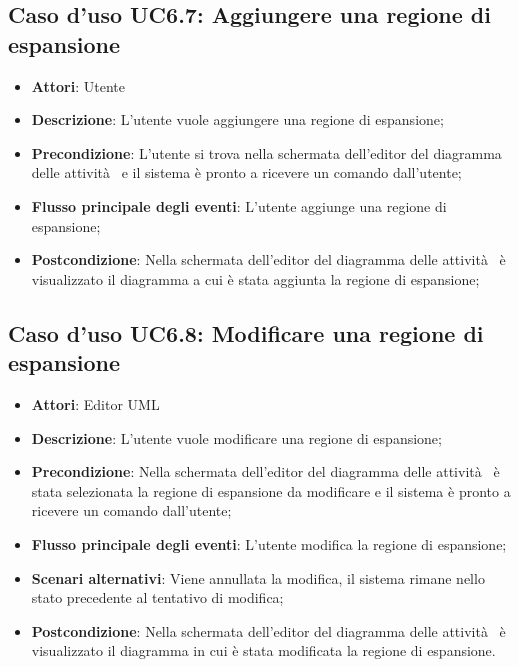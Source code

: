 \documentclass[../AnalisiDeiRequisiti.tex]{subfiles}
\begin{document}
				\subsection{Caso d'uso UC6.7: Aggiungere una regione di espansione}
				\begin{itemize}
					\item \textbf{Attori}: Utente
					\item \textbf{Descrizione}: L'utente vuole aggiungere una regione di espansione;
					\item \textbf{Precondizione}: L'utente si trova nella schermata dell'editor del diagramma delle attività  e il sistema è pronto a ricevere un comando dall'utente;
					\item \textbf{Flusso principale degli eventi}: L'utente aggiunge una regione di espansione;
					\item \textbf{Postcondizione}: Nella schermata dell'editor del diagramma delle attività  è visualizzato il diagramma a cui è stata aggiunta la regione di espansione;
				\end{itemize}
				\subsection{Caso d'uso UC6.8: Modificare una regione di espansione}
				\begin{itemize}
					\item \textbf{Attori}: Editor UML
					\item \textbf{Descrizione}: L'utente vuole modificare una regione di espansione;
					\item \textbf{Precondizione}: Nella schermata dell'editor del diagramma delle attività  è stata selezionata la regione di espansione da modificare e il sistema è pronto a ricevere un comando dall'utente;
					\item \textbf{Flusso principale degli eventi}: L'utente modifica la regione di espansione;
					\item \textbf{Scenari alternativi}: Viene annullata la modifica, il sistema rimane nello stato precedente al tentativo di modifica;
					\item \textbf{Postcondizione}: Nella schermata dell'editor del diagramma delle attività  è visualizzato il diagramma in cui è stata modificata la regione di espansione.
				\end{itemize}
\end{document}
